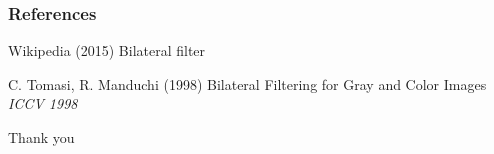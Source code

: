 \documentclass{beamer}
\begin{document}


%        
%        

%
%
%







\begin{frame}
\frametitle{References}
\footnotesize{
\begin{thebibliography}{99} %

 Wikipedia (2015)
\newblock Bilateral filter

 C. Tomasi, R. Manduchi  (1998)
\newblock Bilateral Filtering for Gray and Color Images
\newblock \emph{ICCV 1998}

\end{thebibliography}
}


\end{frame}


\begin{frame}
\Huge{\centerline{Thank you}}
\end{frame}

\end{document}
